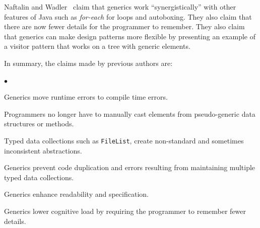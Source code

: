 \documentclass{svjour3}
\newcommand{\code}[1]{\texttt{#1}}
\newcommand{\squishlist}{
   \begin{list}{$\bullet$}
    { \setlength{\itemsep}{0pt}      \setlength{\parsep}{3pt}
      \setlength{\topsep}{3pt}       \setlength{\partopsep}{0pt}
      \setlength{\leftmargin}{1.5em} \setlength{\labelwidth}{1em}
      \setlength{\labelsep}{0.5em} } }
\newcommand{\squishend}{
    \end{list}  }
\begin{document}


Naftalin and Wadler~\cite{naftalin2006Java} claim that generics 
work ``synergistically'' with other features
of Java such as \emph{for-each} for loops and autoboxing.  
They also claim that there are now fewer details for the programmer to remember.  
They also claim that generics can make design patterns more flexible by
presenting an example of a
visitor pattern that works on a tree with generic elements.

In summary, the claims made by previous authors are:

\squishlist

\item Generics move runtime errors to compile time errors. %
\item Programmers no longer have to manually cast elements from pseudo-generic data structures or methods. %

\item Typed data collections such as \code{FileList}, create non-standard and sometimes inconsistent abstractions. %
\item Generics prevent code duplication and errors resulting from maintaining multiple typed data collections. %

\item Generics enhance readability and specification. %
\item Generics lower cognitive load by requiring the programmer to 
remember fewer details. %
\squishend
\end{document}
